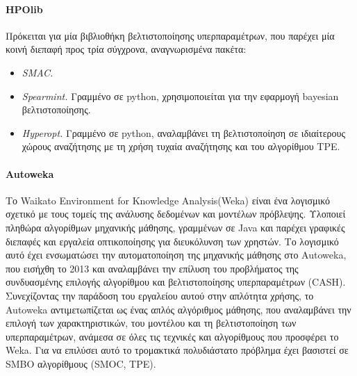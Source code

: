 \documentclass{article}
\begin{document}
\paragraph{HPOlib} Πρόκειται για μία βιβλιοθήκη βελτιστοποίησης υπερπαραμέτρων, που παρέχει μία κοινή διεπαφή προς τρία σύγχρονα, αναγνωρισμένα πακέτα: 
\begin{itemize}
\item \textit{ SMAC.}
\item \textit{ Spearmint.} Γραμμένο σε python, χρησιμοποιείται για την εφαρμογή bayesian βελτιστοποίησης.
\item \textit{ Hyperopt.} Γραμμένο σε python, αναλαμβάνει τη βελτιστοποίηση σε ιδιαίτερους χώρους αναζήτησης με τη χρήση τυχαία αναζήτησης και του αλγορίθμου TPE.
\end{itemize}
\paragraph{Autoweka} Το Waikato Environment for Knowledge Analysis(Weka) είναι ένα λογισμικό σχετικό με τους τομείς της ανάλυσης δεδομένων και μοντέλων πρόβλεψης. Υλοποιεί πληθώρα αλγορίθμων μηχανικής μάθησης, γραμμένων σε Java και παρέχει γραφικές διεπαφές και εργαλεία οπτικοποίησης για διευκόλυνση των χρηστών. Το λογισμικό αυτό έχει ενσωματώσει την αυτοματοποίηση της μηχανικής μάθησης στο Autoweka, που εισήχθη το 2013 και αναλαμβάνει την επίλυση του προβλήματος της συνδυασμένης επιλογής αλγορίθμου και βελτιστοποίησης υπερπαραμέτρων (CASH). Συνεχίζοντας την παράδοση του εργαλείου αυτού στην απλότητα χρήσης, το Autoweka αντιμετωπίζεται ως ένας απλός αλγόριθμος μάθησης, που αναλαμβάνει την επιλογή των χαρακτηριστικών, του μοντέλου και  τη βελτιστοποίηση των υπερπαραμέτρων, ανάμεσα σε όλες τις τεχνικές και αλγορίθμους που προσφέρει το Weka. Για να επιλύσει αυτό το τρομακτικά πολυδιάστατο πρόβλημα έχει βασιστεί σε SMBO αλγορίθμους (SMOC, TPE).  
\end{document}
